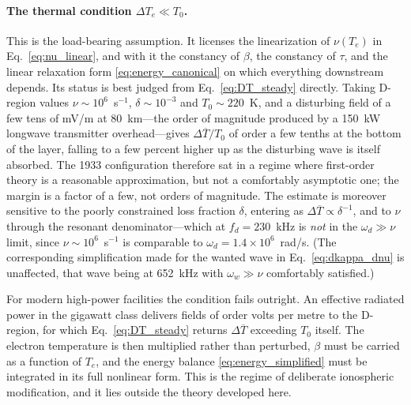 \documentclass[12pt]{article}
\begin{document}
\paragraph{The thermal condition $\Delta T_e \ll T_0$.}
This is the load-bearing assumption.  It licenses the linearization of $\nu(T_e)$ in
Eq.~\eqref{eq:nu_linear}, and with it the constancy of $\beta$, the constancy of $\tau$, and
the linear relaxation form \eqref{eq:energy_canonical} on which everything downstream
depends.  Its status is best judged from Eq.~\eqref{eq:DT_steady} directly.  Taking
D-region values $\nu \sim 10^6$~s$^{-1}$, $\delta \sim 10^{-3}$ and $T_0 \sim 220$~K, and a
disturbing field of a few tens of mV/m at 80~km---the order of magnitude produced by a
150~kW longwave transmitter overhead---gives $\Delta\overline{T}/T_0$ of order a few tenths
at the bottom of the layer, falling to a few percent higher up as the disturbing wave is
itself absorbed.  The 1933 configuration therefore sat in a regime where first-order theory
is a reasonable approximation, but not a comfortably asymptotic one; the margin is a factor
of a few, not orders of magnitude.  The estimate is moreover sensitive to the poorly
constrained loss fraction $\delta$, entering as $\Delta\overline{T} \propto \delta^{-1}$,
and to $\nu$ through the resonant denominator---which at $f_d = 230$~kHz is \emph{not} in
the $\omega_d \gg \nu$ limit, since $\nu \sim 10^6$~s$^{-1}$ is comparable to
$\omega_d = 1.4\times10^6$~rad/s.  (The corresponding simplification made for the wanted
wave in Eq.~\eqref{eq:dkappa_dnu} is unaffected, that wave being at 652~kHz with
$\omega_w \gg \nu$ comfortably satisfied.)

For modern high-power facilities the condition fails outright.  An effective radiated power
in the gigawatt class delivers fields of order volts per metre to the D-region, for which
Eq.~\eqref{eq:DT_steady} returns $\Delta\overline{T}$ exceeding $T_0$ itself.  The electron
temperature is then multiplied rather than perturbed, $\beta$ must be carried as a function
of $T_e$, and the energy balance \eqref{eq:energy_simplified} must be integrated in its full
nonlinear form.  This is the regime of deliberate ionospheric modification, and it lies
outside the theory developed here.
\end{document}
